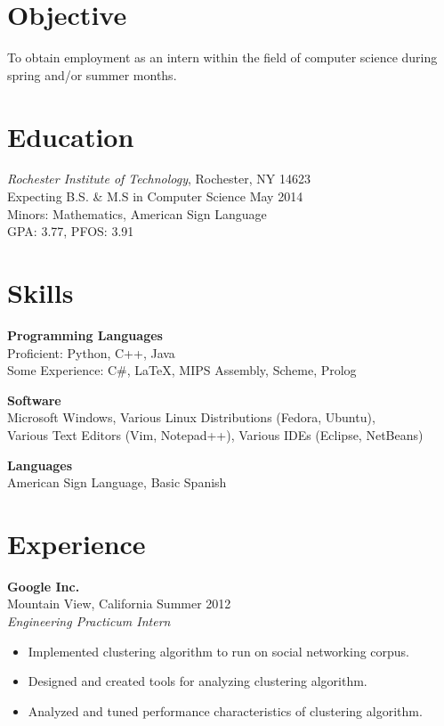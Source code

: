 \documentclass[margin]{res}
\begin{document}

\address{{\bf Present Address} \\ 204 Goldenrod Lane \\
		Rochester, NY 14623 }

\address{{\bf \hfill Permanent Address} \\ \hfill 46 Juniper Drive \\ 
		Clifton Park, NY 12065 }
		
\begin{resume}

\section{Objective}
To obtain employment as an intern within the field of computer science during
spring and/or summer months.


\section{Education}
\emph{Rochester Institute of Technology}, Rochester, NY 14623 \\
Expecting B.S. \& M.S in Computer Science May 2014\\
Minors: Mathematics, American Sign Language \\
GPA: 3.77, PFOS: 3.91


\section{Skills}
\textbf{Programming Languages} \\
Proficient: Python, C++, Java \\
Some Experience: C\#, \LaTeX, MIPS Assembly, Scheme, Prolog

\textbf{Software} \\
Microsoft Windows, Various Linux Distributions (Fedora, Ubuntu), \\
Various Text Editors (Vim, Notepad++), Various IDEs (Eclipse, NetBeans)

\textbf{Languages} \\
American Sign Language, Basic Spanish


\section{Experience}
\textbf{Google Inc.} \\
Mountain View, California \hfill Summer 2012 \\
\emph{Engineering Practicum Intern}
\begin{itemize}
  \setlength{\itemsep}{-2pt}
  \item Implemented clustering algorithm to run on social networking corpus.
  \item Designed and created tools for analyzing clustering algorithm.
  \item Analyzed and tuned performance characteristics of clustering algorithm.
\end{itemize}


\end{resume}
\end{document}
